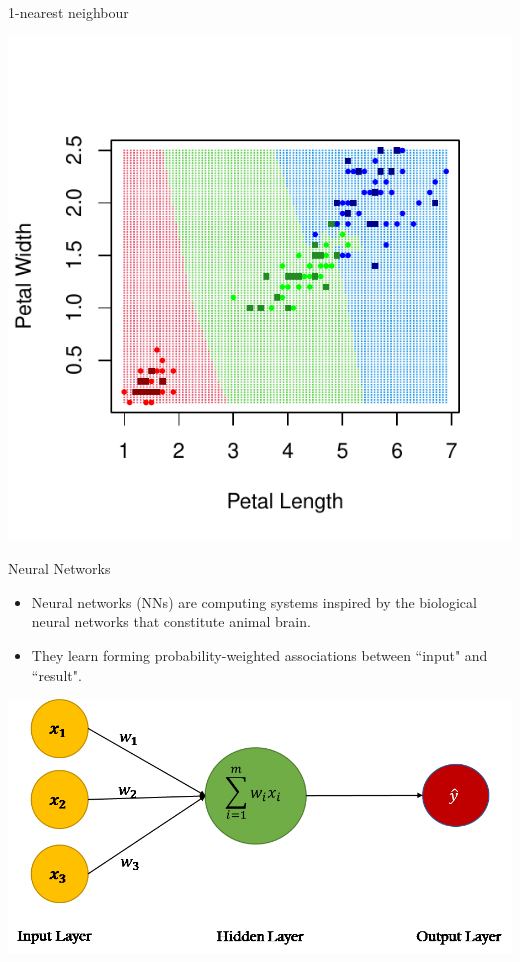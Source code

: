 \documentclass[aspectratio=1610, t]{beamer}\usepackage[]{graphicx}\usepackage[]{color}
\makeatletter
\def\maxwidth{ %
  \ifdim\Gin@nat@width>\linewidth
    \linewidth
  \else
    \Gin@nat@width
  \fi
}
\newenvironment{knitrout}{}{} %
\makeatother
\begin{document}
\begin{frame}{1-nearest neighbour}
\vspace{-2cm}
\begin{knitrout}
\color{fgcolor}

{\centering \includegraphics[width=\maxwidth]{figure/knn1-1} 

}


\end{knitrout}
\end{frame}



\begin{frame}[t]{Neural Networks}

\begin{itemize}
  \item Neural networks (NNs) are computing systems inspired by the biological neural networks that constitute animal brain. 
  \item They learn forming probability-weighted associations between ``input" and ``result". 
\end{itemize}

\centering
\includegraphics[scale=0.3]{neuron.png}
        
\end{frame}
\end{document}
